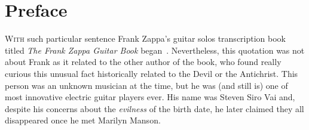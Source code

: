 \chapter*{Preface}

{}
\vspace{2\baselineskip}
\noindent \lettrine[lines=2, findent=1pt, nindent=0pt]{W}{ith} such particular sentence Frank Zappa's guitar solos transcription book titled {\it The Frank Zappa Guitar Book} began~\cite{Book:ZappaVai:1982}. Nevertheless, this quotation was not about Frank as it related to the other author of the book, who found really curious this unusual fact historically related to the Devil or the Antichrist. This person was an unknown musician at the time, but he was (and still is) one of most innovative electric guitar players ever. His name was Steven Siro Vai and, despite his concerns about the {\it evilness} of the birth date, he later claimed they all disappeared once he met Marilyn Manson.



